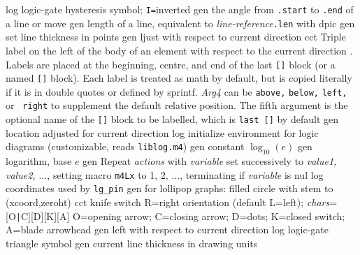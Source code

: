   {log}
  {logic-gate hysteresis symbol; {\tt I=}inverted}
  {gen}
  {the angle from {\tt .start} to {\tt .end} of a line or move}
  {gen}
  {length of a line, equivalent to {\sl line-reference}{\tt .len}
   with dpic}
  {gen}
  {set line thickness in points}
  {gen}
  {ljust with respect to current direction}
  {cct}
  {Triple label on the left of the body of an element with respect to the
    current direction .  Labels are placed at the
    beginning, centre, and end of the last {\tt []} block (or a named
    {\tt []} block). Each label is treated as math by default, but is
    copied literally if it is in double quotes or defined by sprintf.
    {\sl Arg4} can be {\tt above,} {\tt below,} {\tt left,} or {\tt
    right} to supplement the default relative position.  The fifth
    argument is the optional name of the {\tt []} block to be labelled,
    which is {\tt last []} by default}
  {gen}
  {location adjusted for current direction}
  {log}
  {initialize environment for logic diagrams
    (customizable, reads {\tt liblog.m4})}
  {gen}
  {constant $\log_{10}(e)$}
  {gen}
  {logarithm, base $e$}
  {gen}
  {Repeat {\sl actions} with {\sl variable} set successively to
   {\sl value1, value2, $\ldots$}, setting macro {\tt m4Lx} to 1, 2,
   $\ldots$, terminating if {\sl variable} is nul}
  {log}
  {coordinates used by {\tt lg\_pin}}
 {gen}
  {for lollipop graphs: filled circle with stem to
  (xcoord,zeroht)}
  {cct}
  {knife switch R=right orientation (default L=left);
    {\sl chars}=[O{\tt|}C][D][K][A] O=opening arrow; C=closing arrow;
    D=dots; K=closed switch; A=blade arrowhead }
  {gen}
  {left with respect to current direction}
  {log}
  {logic-gate triangle symbol}
  {gen}
  {current line thickness in drawing units}
